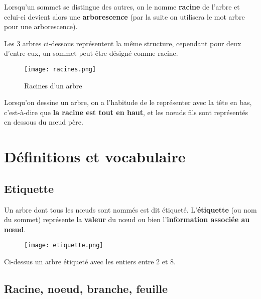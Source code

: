 \documentclass[french]{article}
\theoremstyle{plain}
\begin{document}
Lorsqu'un sommet se distingue des autres, on le nomme \textbf{racine} de l'arbre et celui-ci devient alors une \textbf{arborescence} (par la suite on utilisera le mot arbre pour une arborescence).

Les 3 arbres ci-dessous représentent la même structure, cependant pour deux d'entre eux, un sommet peut être désigné comme racine.

	\begin{figure}[h]  %
	\centering
	\texttt{[image: racines.png]}
	\caption{Racines d'un arbre}
	\end{figure}
	
	Lorsqu'on dessine un arbre, on a l'habitude de le représenter avec la tête en bas, c'est-à-dire que \textbf{la racine est tout en haut}, et les nœuds fils sont représentés en dessous du nœud père.
	
	\section{Définitions et vocabulaire}
	
	
		\subsection{Etiquette}
		
		\begin{tcolorbox}[colback=red!5!white,colframe=red!75!black,title=A retenir !]
			
Un arbre dont tous les nœuds sont nommés est dit étiqueté. L'\textbf{étiquette} (ou nom du sommet) représente la \textbf{valeur} du nœud ou bien l'\textbf{information associée au nœud}.
			
		\end{tcolorbox}
		
		
			\begin{figure}[h]  %
			\centering
			\texttt{[image: etiquette.png]}
		\end{figure}
		
		Ci-dessus un arbre étiqueté avec les entiers entre 2 et 8. 
		
			\subsection{Racine, noeud, branche, feuille}
			
\end{document}
